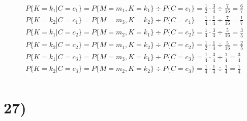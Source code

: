   \begin{align*}
    & P\{K = k_1 | C = c_1\} = P\{M = m_1, K = k_1\} \div P\{C = c_1\} = \frac{1}{2} \cdot \frac{3}{4} \div \frac{7}{16} = \frac{6}{7}\\
    & P\{K = k_2 | C = c_1\} = P\{M = m_3, K = k_2\} \div P\{C = c_1\} = \frac{1}{4} \cdot \frac{1}{4} \div \frac{7}{16} = \frac{1}{7}\\
    & P\{K = k_1 | C = c_2\} = P\{M = m_2, K = k_1\} \div P\{C = c_2\} = \frac{1}{4} \cdot \frac{3}{4} \div \frac{5}{16} = \frac{3}{5}\\
    & P\{K = k_2 | C = c_2\} = P\{M = m_1, K = k_2\} \div P\{C = c_2\} = \frac{1}{2} \cdot \frac{1}{4} \div \frac{5}{16} = \frac{2}{5}\\
    & P\{K = k_1 | C = c_3\} = P\{M = m_3, K = k_1\} \div P\{C = c_3\} = \frac{1}{4} \cdot \frac{3}{4} \div \frac{1}{4} = \frac{3}{4}\\
    & P\{K = k_2 | C = c_3\} = P\{M = m_2, K = k_2\} \div P\{C = c_3\} = \frac{1}{4} \cdot \frac{1}{4} \div \frac{1}{4} = \frac{1}{4}\\
  \end{align*}

  \section*{27)}

